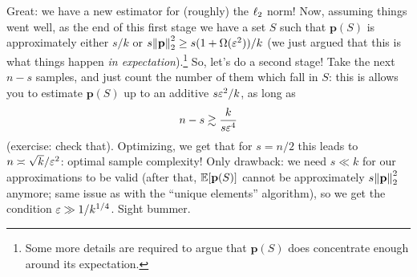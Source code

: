\documentclass[10pt]{article}
\newcommand{\dst}{\eps}
\newcommand{\ab}{k}
\newcommand{\ns}{n}
\newcommand{\p}{\mathbf{p}}
\begin{document}
Great: we have a new estimator for (roughly) the $\lp[2]$ norm! Now, assuming things went well, as the end of this first stage we have a set $S$ such that $\p(S)$ is approximately either $s/\ab$ or $s\normtwo{\p}^2\geq s(1+\Omega(\dst^2))/\ab$ (we just argued that this is what things happen \emph{in expectation}).\footnote{Some more details are required to argue that $\p(S)$ does concentrate enough around its expectation.} So, let's do a second stage! Take the next $\ns-s$ samples, and just count the number of them which fall in $S$: this is allows you to estimate $\p(S)$  up to an additive $s\dst^2/\ab$, as long as
\[
      \ns - s \gtrsim \frac{\ab}{s\dst^4}
\]
(exercise: check that). Optimizing, we get that for $s=\ns/2$ this leads to $\ns \asymp \sqrt{\ab}/\dst^2$: optimal sample complexity! Only drawback: we need $s\ll \ab$ for our approximations to be valid (after that, $\expect{\p(S)}$ cannot be approximately $s\normtwo{\p}^2$ anymore; same issue as with the ``unique elements'' algorithm), so we get the condition $\dst \gg 1/\ab^{1/4}$. Sight bummer.
\end{document}
